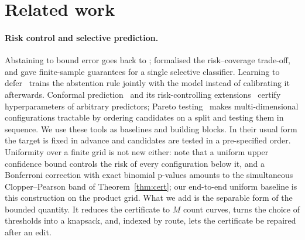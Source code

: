 \documentclass[11pt]{article}
\theoremstyle{definition}
\theoremstyle{remark}
\begin{document}


\section{Related work}\label{sec:related}

\paragraph{Risk control and selective prediction.} Abstaining to bound error goes back to
\citet{chow1970}; \citet{elyaniv2010} formalised the risk--coverage trade-off, and
\citet{geifman2017selective} gave finite-sample guarantees for a single selective classifier.
Learning to defer~\citep{mozannar2020} trains the abstention rule jointly with the model
instead of calibrating it afterwards. Conformal prediction~\citep{vovk2005} and its risk-controlling
extensions~\citep{bates2021rcps,angelopoulos2021ltt,angelopoulos2022crc} certify
hyperparameters of arbitrary predictors; Pareto testing~\citep{laufer2022pareto} makes
multi-dimensional configurations tractable by ordering candidates on a split and testing them
in sequence. We use these tools as baselines and building blocks. In their usual form the
target is fixed in advance and candidates are tested in a pre-specified order. Uniformity
over a finite grid is not new either: \citet[\S2.5]{angelopoulos2021ltt} note that a uniform
upper confidence bound controls the risk of every configuration below it, and a Bonferroni
correction with exact binomial p-values amounts to the simultaneous Clopper--Pearson band of
Theorem~\ref{thm:cert}; our end-to-end uniform baseline is this construction on the product
grid. What we add is the separable form of the bounded quantity. It reduces the certificate
to $M$ count curves, turns the choice of thresholds into a knapsack, and, indexed by route,
lets the certificate be repaired after an edit.
\end{document}

